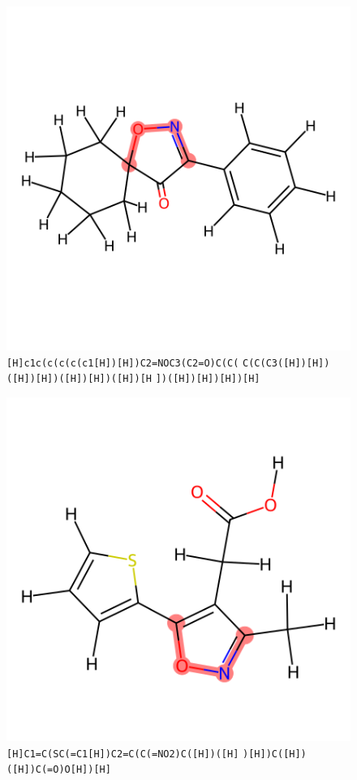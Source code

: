 \documentclass{article}
\begin{document}
\begin{figure}[ht]
\centering
    \includegraphics{mol08.png}
\cprotect\caption{\verb|[H]c1c(c(c(c(c1[H])[H])C2=NOC3(C2=O)C(C(| \verb|C(C(C3([H])[H])([H])[H])([H])[H])([H])[H| \verb|])([H])[H])[H])[H]| }
\end{figure}

\begin{figure}[ht]
\centering
    \includegraphics{mol09.png}
\cprotect\caption{\verb|[H]C1=C(SC(=C1[H])C2=C(C(=NO2)C([H])([H]| \verb|)[H])C([H])([H])C(=O)O[H])[H]| }
\end{figure}
\end{document}
